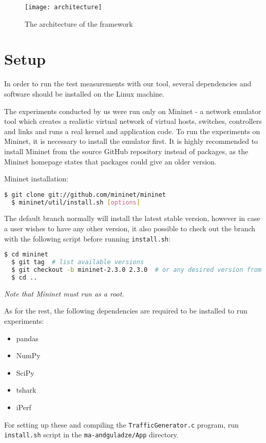 \begin{figure}[htp]
 \centering
 \texttt{[image: architecture]}
 \caption{The architecture of the framework}
 \label{fig}

\end{figure}


\section{Setup}
In order to run the test measurements with our tool, several dependencies and software should be installed on the Linux machine.

The experiments conducted by us were run only on Mininet - a network emulator tool which creates a realistic virtual network of virtual hosts, switches, controllers and links and runs a real kernel and application code\cite{mnHome}.
To run the experiments on Mininet, it is necessary to install the emulator first.
It is highly recommended to install Mininet from the source GitHub repository instead of packages, as the Mininet homepage\cite{mnInstall} states that packages could give an older version. 

Mininet installation:
\begin{lstlisting}[language=bash]
  $ git clone git://github.com/mininet/mininet
  $ mininet/util/install.sh [options]
\end{lstlisting}
The default branch normally will install the latest stable version, however in case a user wishes to have any other version, it also possible to check out the branch with the following script before running \texttt{install.sh}:
\begin{lstlisting}[language=bash]
  $ cd mininet
  $ git tag  # list available versions
  $ git checkout -b mininet-2.3.0 2.3.0  # or any desired version from the list
  $ cd ..
\end{lstlisting}
\emph{Note that Mininet must run as a root.}


As for the rest, the following dependencies are required to be installed to run experiments:
\begin{itemize}
	\item pandas
	\item NumPy
	\item SciPy
	\item tshark
	\item iPerf
\end{itemize}
For setting up these and compiling the \texttt{TrafficGenerator.c} program, run \texttt{install.sh} script in the \texttt{ma-andguladze/App} directory.

